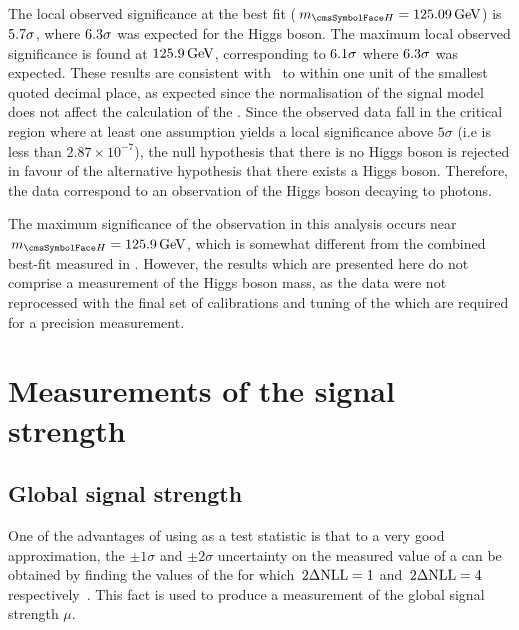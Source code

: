 The local observed significance at the \RunI best fit ($\mH=125.09\GeV$) is $5.7\sigma$, where $6.3\sigma$ was expected for the \SM Higgs boson. The maximum local observed significance is found at $125.9\,\text{Ge\hspace{-.08em}V}$, corresponding to $6.1\sigma$ where $6.3\sigma$ was expected. These results are consistent with~\cite{CMS-PAS-HIG-16-020} to within one unit of the smallest quoted decimal place, as expected since the normalisation of the signal model does not affect the calculation of the \pvalue. %
Since the observed data fall in the critical region where at least one \mH assumption yields a local significance above $5\sigma$ (i.e \pvalue is less than $2.87 \times 10^{-7}$), the null hypothesis that there is no Higgs boson is rejected in favour of the alternative hypothesis that there exists a Higgs boson. Therefore, the data correspond to an observation of the Higgs boson decaying to photons.

The maximum significance of the observation in this analysis occurs near $\mH=\bestFitGlobalMH\GeV$, which is somewhat different from the combined best-fit \mH measured in \RunI. %
However, the results which are presented here do not comprise a measurement of the Higgs boson mass, as the data were not reprocessed with the final set of \ECAL calibrations and tuning of the \PhoEnergyBdt which are required for a precision measurement. %

\section{Measurements of the signal strength}
\label{sec:statandresults:sigstrength}
\subsection{Global signal strength}
\label{sec:statandresults:sigstrength_global}

One of the advantages of using \DNLL as a test statistic is that to a very good approximation, the $\pm 1 \sigma$ and $\pm 2 \sigma$ uncertainty on the measured value of a \POI can be obtained by finding the values of the \POI for which $\,2\Delta\text{NLL}=1$ and $\,2\Delta\text{NLL}=4$ respectively~\cite{Cowan}. %
This fact is used to produce a measurement of the global signal strength $\mu$. 

